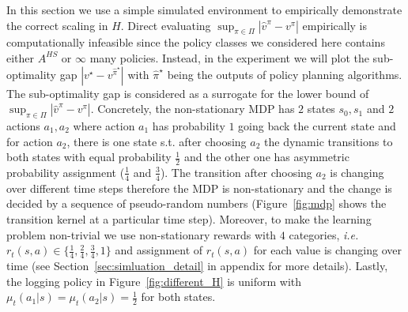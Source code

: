 



In this section we use a simple simulated environment to empirically demonstrate the correct scaling in $H$. Direct evaluating $\sup_{\pi\in\Pi} |\widehat{v}^\pi-v^\pi|$ empirically is computationally infeasible since the policy classes we considered here contains either $A^{HS}$ or $\infty$ many policies. 
Instead, in the experiment we will plot the sub-optimality gap $ |v^\star-v^{\widehat{\pi}^\star}|$ with $\hat{\pi}^\star$ being the outputs of policy planning algorithms. The sub-optimality gap is considered as a surrogate for the lower bound of $\sup_{\pi\in\Pi} |\widehat{v}^\pi-v^\pi|$.
Concretely, the non-stationary MDP has $2$ states $s_0,s_1$ and $2$ actions $a_1,a_2$ where action $a_1$ has probability $1$ going back the current state and for action $a_2$, there is one state s.t. after choosing $a_2$ the dynamic transitions to both states with equal probability $\frac{1}{2}$ and the other one has asymmetric probability assignment ($\frac{1}{4}$ and $\frac{3}{4}$). The transition after choosing $a_2$ is changing over different time steps therefore the MDP is non-stationary and the change is decided by a sequence of pseudo-random numbers (Figure~\ref{fig:mdp} shows the transition kernel at a particular time step). Moreover, to make the learning problem non-trivial we use non-stationary rewards with $4$ categories, \emph{i.e.} $r_t(s,a)\in\{\frac{1}{4},\frac{2}{4},\frac{3}{4},1\}$ and assignment of $r_t(s,a)$ for each value is changing over time (see Section~\ref{sec:simluation_detail} in appendix for more details). Lastly, the logging policy in Figure~\ref{fig:different_H} is uniform with $\mu_t(a_1|s)=\mu_t(a_2|s)=\frac{1}{2}$ for both states.


